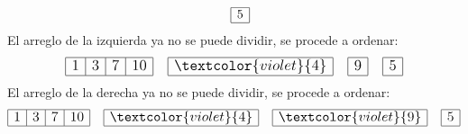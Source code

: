 \documentclass{article}
\begin{document}
\begin{minipage}{0.5\textwidth}
\begin{equation*}
\begin{array}{|r|}
    \end{array}\quad 
    \begin{array}{|r|}
      \hline 5 \\ \hline
    \end{array}
  \end{equation*}
  El arreglo de la izquierda ya no se puede dividir, se procede a ordenar:
  \begin{equation*}
    \large
    \begin{array}{|r|r|r|r|}
      \hline 1 & 3 & 7 & 10 \\ \hline
    \end{array}\quad 
    \begin{array}{|r|}
      \hline \textcolor{violet}{4} \\ \hline
    \end{array} \quad
    \begin{array}{|r|}
      \hline 9 \\ \hline
    \end{array}\quad 
    \begin{array}{|r|}
      \hline 5 \\ \hline
    \end{array}
  \end{equation*}
  El arreglo de la derecha ya no se puede dividir, se procede a ordenar:
  \begin{equation*}
    \large
    \begin{array}{|r|r|r|r|}
      \hline 1 & 3 & 7 & 10 \\ \hline
    \end{array}\quad 
    \begin{array}{|r|}
      \hline \textcolor{violet}{4} \\ \hline
    \end{array} \quad
    \begin{array}{|r|}
      \hline \textcolor{violet}{9} \\ \hline
    \end{array}\quad 
    \begin{array}{|r|}
      \hline 5 \\ \hline
    \end{array}
  \end{equation*}
\end{minipage}
\end{document}
